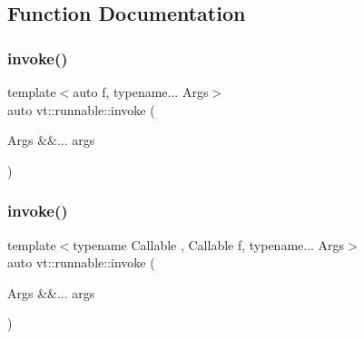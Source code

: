 \subsection{Function Documentation}
\mbox{\label{namespacevt_1_1runnable_a004d4b72c158a64f01404ac5dac24ec6}} 
\subsubsection{\texorpdfstring{invoke()}{invoke()}\hspace{0.1cm}{\footnotesize\ttfamily [1/2]}}
{\footnotesize\ttfamily template$<$auto f, typename... Args$>$ \\
auto vt\+::runnable\+::invoke (\begin{DoxyParamCaption}\item[{Args \&\&...}]{args }\end{DoxyParamCaption})}

\mbox{\label{namespacevt_1_1runnable_a767f5673027ff59a60d513209691f5ed}} 
\subsubsection{\texorpdfstring{invoke()}{invoke()}\hspace{0.1cm}{\footnotesize\ttfamily [2/2]}}
{\footnotesize\ttfamily template$<$typename Callable , Callable f, typename... Args$>$ \\
auto vt\+::runnable\+::invoke (\begin{DoxyParamCaption}\item[{Args \&\&...}]{args }\end{DoxyParamCaption})}

\mbox{\label{namespacevt_1_1runnable_afb8d5dae85a94591271296e201b4f838}} 
